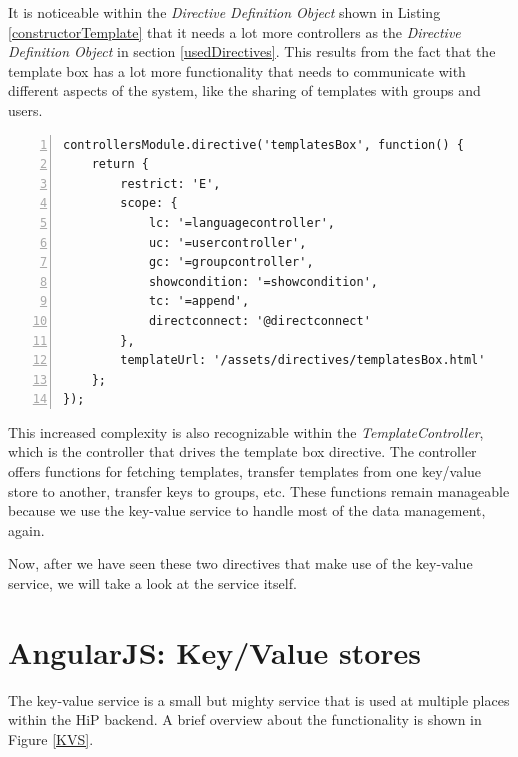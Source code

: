 It is noticeable within the \emph{Directive Definition Object} shown in Listing \ref{constructorTemplate} that it needs a lot more controllers as the \emph{Directive Definition Object} in section \ref{usedDirectives}. This results from the fact that the template box has a lot more functionality that needs to communicate with different aspects of the system, like the sharing of templates with groups and users.

\begin{lstlisting}[numbers=left,caption={The listing shows the initialisation of the template box directive.},label=constructorTemplate,frame=tlbr,breaklines]
controllersModule.directive('templatesBox', function() {
    return {
        restrict: 'E',
        scope: {
            lc: '=languagecontroller',
            uc: '=usercontroller',
            gc: '=groupcontroller',
            showcondition: '=showcondition',
            tc: '=append',
            directconnect: '@directconnect'
        },
        templateUrl: '/assets/directives/templatesBox.html'
    };
});
\end{lstlisting}

This increased complexity is also recognizable within the \emph{TemplateController}, which is the controller that drives the template box directive. The controller offers functions for fetching templates, transfer templates from one key/value store to another, transfer keys to groups, etc. These functions remain manageable because we use the key-value service to handle most of the data management, again. 

Now, after we have seen these two directives that make use of the key-value service, we will take a look at the service itself.

\section{AngularJS: Key/Value stores}
\label{keyValueService}

The key-value service is a small but mighty service that is used at multiple places within the \ac{HiP} backend. A brief overview about the functionality is shown in Figure \ref{KVS}.

